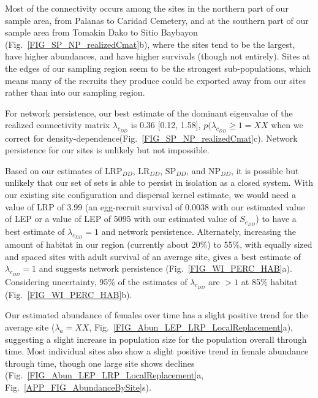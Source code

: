 \documentclass[12pt, oneside]{article}   	%
\begin{document}
Most of the connectivity occurs among the sites in the northern part of our sample area, from Palanas to Caridad Cemetery, and at the southern part of our sample area from Tomakin Dako to Sitio Baybayon (Fig.\ \ref{FIG_SP_NP_realizedCmat}b), where the sites tend to be the largest, have higher abundances, and have higher survivals (though not entirely). Sites at the edges of our sampling region seem to be the strongest sub-populations, which means many of the recruits they produce could be exported away from our sites rather than into our sampling region. %

For network persistence, our best estimate of the dominant eigenvalue of the realized connectivity matrix $\lambda_{c_{DD}}$ is 0.36 [0.12, 1.58], $p(\lambda_{c_{DD}} \geq 1 = XX$ when we correct for density-dependence(Fig.\ \ref{FIG_SP_NP_realizedCmat}c). Network persistence for our sites is unlikely but not impossible. 

Based on our estimates of $\text{LRP}_{DD}$, $\text{LR}_{DD}$, $\text{SP}_{DD}$, and $\text{NP}_{DD}$, it is possible but unlikely that our set of sets is able to persist in isolation as a closed system. With our existing site configuration and dispersal kernel estimate, we would need a value of LRP of 3.99 (an egg-recruit survival of 0.0038 with our estimated value of LEP or a value of LEP of 5095 with our estimated value of $S_{e_{DD}}$) to have a best estimate of $\lambda_{c_{DD}} = 1$ and network persistence. Alternately, increasing the amount of habitat in our region (currently about 20\%) to 55\%, with equally sized and spaced sites with adult survival of an average site, gives a best estimate of $\lambda_{c_{DD}} = 1$ and suggests network persistence (Fig.\ \ref{FIG_WI_PERC_HAB}a). Considering uncertainty, 95\% of the estimates of $\lambda_{c_{DD}}$ are $> 1$ at 85\% habitat (Fig.\ \ref{FIG_WI_PERC_HAB}b).

Our estimated abundance of females over time has a slight positive trend for the average site ($\lambda_a = XX$, Fig.\ \ref{FIG_Abun_LEP_LRP_LocalReplacement}a), suggesting a slight increase in population size for the population overall through time. Most individual sites also show a slight positive trend in female abundance through time, though one large site shows declines (Fig.\ \ref{FIG_Abun_LEP_LRP_LocalReplacement}a, Fig.\ \ref{APP_FIG_AbundanceBySite}s). %

\end{document}
